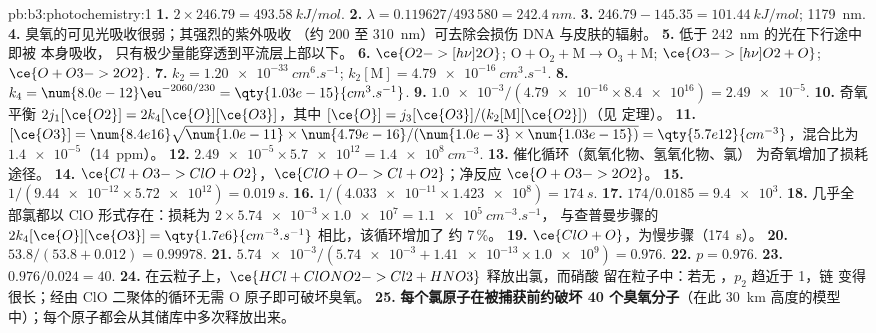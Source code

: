 \begin{solution}{pb:b3:photochemistry:1}
\textbf{1.} $2 \times 246.79 = \qty{493.58}{kJ/mol}$.
\textbf{2.} $\lambda = 0.119627/493\,580 = \qty{242.4}{nm}$.
\textbf{3.} $246.79 - 145.35 = \qty{101.44}{kJ/mol}$; \qty{1179}{nm}.
\textbf{4.} 臭氧的可见光吸收很弱；其强烈的紫外吸收
（约 200 至 \qty{310}{nm}）可去除会损伤 DNA 与皮肤的辐射。
\textbf{5.} 低于 \qty{242}{nm} 的光在下行途中即被  本身吸收，
只有极少量能穿透到平流层上部以下。
\textbf{6.} $\ce{O2 ->[h\nu] 2 O}$; $\mathrm{O + O_2 + M \to O_3 + M}$; $\ce{O3 ->[h\nu] O2 + O}$; $\ce{O + O3 -> 2 O2}$.
\textbf{7.} $k_2 = \qty{1.20e-33}{cm^6.s^{-1}}$; $k_2[\mathrm M] = \qty{4.79e-16}{cm^3.s^{-1}}$.
\textbf{8.} $k_4 = \num{8.0e-12}\eu^{-2060/230} = \qty{1.03e-15}{cm^3.s^{-1}}$.
\textbf{9.} $\num{1.0e-3}/(\num{4.79e-16} \times \num{8.4e16}) = \num{2.49e-5}$.
\textbf{10.} 奇氧平衡 $2j_1[\ce{O2}] = 2k_4[\ce{O}][\ce{O3}]$，其中 $[\ce{O}] = j_3[\ce{O3}]/(k_2[\mathrm M][\ce{O2}])$（见
定理）。
\textbf{11.} $[\ce{O3}] = \num{8.4e16}\sqrt{\num{1.0e-11} \times \num{4.79e-16}/(\num{1.0e-3} \times \num{1.03e-15})} =
\qty{5.7e12}{cm^{-3}}$，混合比为 $\num{1.4e-5}$（\qty{14}{ppm}）。
\textbf{12.} $\num{2.49e-5} \times \num{5.7e12} = \qty{1.4e8}{cm^{-3}}$.
\textbf{13.} 催化循环（氮氧化物、氢氧化物、氯）
为奇氧增加了损耗途径。
\textbf{14.} $\ce{Cl + O3 -> ClO + O2}$，$\ce{ClO + O -> Cl + O2}$；净反应 $\ce{O + O3 -> 2 O2}$。
\textbf{15.} $1/(\num{9.44e-12} \times \num{5.72e12}) = \qty{0.019}{s}$.
\textbf{16.} $1/(\num{4.033e-11} \times \num{1.423e8}) = \qty{174}{s}$.
\textbf{17.} $174/0.0185 = \num{9.4e3}$.
\textbf{18.} 几乎全部氯都以 ClO 形式存在：损耗为 $2 \times \num{5.74e-3} \times \num{1.0e7} = \qty{1.1e5}{cm^{-3}.s^{-1}}$，
与查普曼步骤的 $2k_4[\ce{O}][\ce{O3}] = \qty{1.7e6}{cm^{-3}.s^{-1}}$ 相比，该循环增加了
约 7\,\%。
\textbf{19.} $\ce{ClO + O}$，为慢步骤（\qty{174}{s}）。
\textbf{20.} $53.8/(53.8 + 0.012) = 0.99978$.
\textbf{21.} $\num{5.74e-3}/(\num{5.74e-3} + \num{1.41e-13} \times \num{1.0e9}) = 0.976$.
\textbf{22.} $p = 0.976$.
\textbf{23.} $0.976/0.024 = 40$.
\textbf{24.} 在云粒子上，$\ce{HCl + ClONO2 -> Cl2 + HNO3}$ 释放出氯，而硝酸
留在粒子中：若无 ，$p_2$ 趋近于 1，链
变得很长；经由 ClO 二聚体的循环无需 O 原子即可破坏臭氧。
\textbf{25.} \textbf{每个氯原子在被捕获前约破坏 40 个臭氧分子}（在此
\qty{30}{km} 高度的模型中）；每个原子都会从其储库中多次释放出来。
\end{solution}
